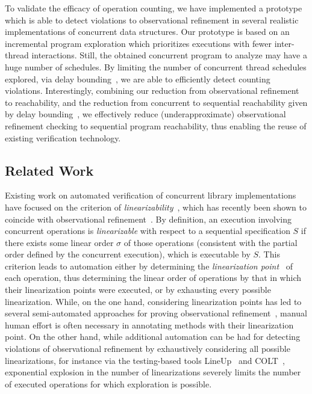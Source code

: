 To validate the efficacy of operation counting, we have implemented a prototype
which is able to detect violations to observational refinement in several
realistic implementations of concurrent data structures. Our prototype is based
on an incremental program exploration which prioritizes executions with fewer
inter-thread interactions. Still, the obtained concurrent program to analyze may have a huge number of schedules.
By limiting the number of concurrent thread schedules explored, via delay
bounding~\citep{ conf/popl/EmmiQR11}, we are able to efficiently detect
counting violations. Interestingly, combining our reduction from observational
refinement to reachability, and the reduction from concurrent to sequential
reachability given by delay bounding~\citep{ conf/popl/EmmiQR11}, we
effectively reduce (underapproximate) observational refinement checking to
sequential program reachability, thus enabling the reuse of existing
verification technology.

\subsection{Related Work}
\label{sec:related}

Existing work on automated verification of concurrent library implementations
have focused on the criterion of
\emph{linearizability}~\citep{journals/toplas/HerlihyW90}, which has recently
been shown to coincide with observational
refinement~\citep{journals/tcs/FilipovicORY10}. By definition, an execution
involving concurrent operations is \emph{linearizable} with respect to a
sequential specification $S$ if there exists some linear order $\sigma$ of
those operations (consistent with the partial order defined by the concurrent execution), 
which is executable by $S$. This criterion leads to automation
either by determining the \emph{linearization
point}~\citep{journals/toplas/HerlihyW90} of each operation, thus determining
the linear order of operations by that in which their linearization points were
executed, or by exhausting every possible linearization. While, on the one
hand, considering linearization points has led to several semi-automated
approaches for proving observational refinement~\citep{DBLP:conf/cav/AmitRRSY07,conf/fm/LiuCLS09, conf/podc/OHearnRVYY10,
conf/cav/Vafeiadis10, conf/icse/Zhang11a, conf/pldi/LiangF13,
conf/cav/DragoiGH13}, manual human effort is often necessary in annotating
methods with their linearization point. On the other hand, while additional
automation can be had for detecting violations of observational refinement 
by exhaustively considering all possible linearizations,
for instance via the testing-based tools LineUp~\citep{conf/pldi/BurckhardtDMT10} and COLT~\citep{DBLP:conf/oopsla/ShachamBASVY11}, exponential
explosion in the number of linearizations severely limits the number of
executed operations for which exploration is possible. 

